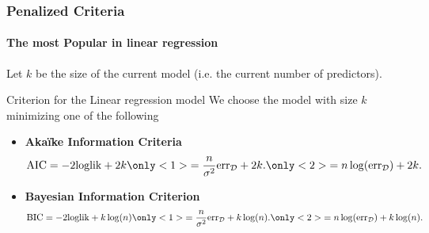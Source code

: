 \documentclass{beamer}\usepackage[]{graphicx}\usepackage[]{color}
\begin{document}
\begin{frame}
  \frametitle{Penalized Criteria}
  \framesubtitle{The most Popular in linear regression}

    Let $k$ be the size of the current model (i.e. the current number of predictors).
    
    \vfill

    \begin{block}{Criterion for the Linear regression model
        }
      We choose  the model with size  $k$ minimizing one of the following
      \begin{itemize}
    \item      \alert{\bf      Aka\"ike     Information      Criteria}
       
      \[ 
      \mathrm{AIC} = - 2 \mathrm{loglik} + 2 k
      \only<1>{ = \frac{n}{\sigma^2} \mathrm{err}_{\mathcal{D}} + 2 k .}
      \only<2>{ = n \log(\mathrm{err}_{\mathcal{D}}) + 2 k .}
      \]
      
    \item \alert{\bf Bayesian Information Criterion} 
      \[ 
      \mathrm{BIC} = - 2 \mathrm{loglik} + k \log(n)
      \only<1>{ = \frac{n}{\sigma^2} \mathrm{err}_{\mathcal{D}} + k \log(n) .}
      \only<2>{ = n \log(\mathrm{err}_{\mathcal{D}}) + k \log(n) .}
      \]
    \end{itemize}
    \end{block}
  
\end{frame}
\end{document}

